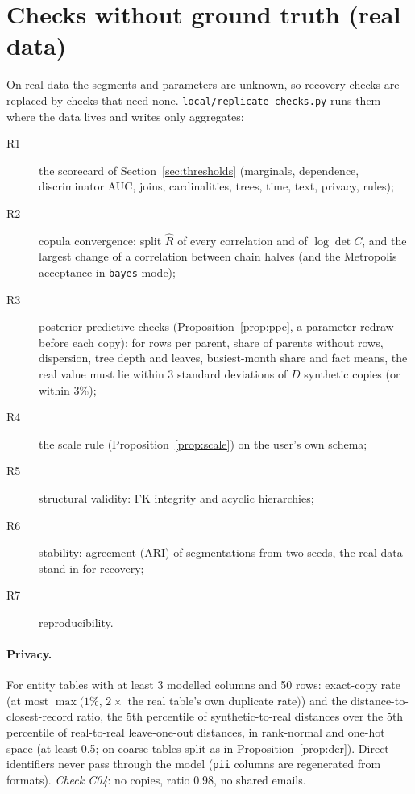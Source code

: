 \documentclass[11pt,a4paper]{article}
\theoremstyle{definition}
\theoremstyle{remark}
\begin{document}
\section{Checks without ground truth (real data)}\label{sec:real}
On real data the segments and parameters are unknown, so recovery checks are replaced by checks that need none. \texttt{local/replicate\_checks.py} runs them where the data lives and writes only aggregates:
\begin{description}
\item[R1] the scorecard of Section~\ref{sec:thresholds} (marginals, dependence, discriminator AUC, joins, cardinalities, trees, time, text, privacy, rules);
\item[R2] copula convergence: split $\hat R$ of every correlation and of $\log\det C$, and the largest change of a correlation between chain halves (and the Metropolis acceptance in \texttt{bayes} mode);
\item[R3] posterior predictive checks (Proposition~\ref{prop:ppc}, a parameter redraw before each copy): for rows per parent, share of parents without rows, dispersion, tree depth and leaves, busiest-month share and fact means, the real value must lie within $3$ standard deviations of $D$ synthetic copies (or within 3\%);
\item[R4] the scale rule (Proposition~\ref{prop:scale}) on the user's own schema;
\item[R5] structural validity: FK integrity and acyclic hierarchies;
\item[R6] stability: agreement (ARI) of segmentations from two seeds, the real-data stand-in for recovery;
\item[R7] reproducibility.
\end{description}
\paragraph{Privacy.} For entity tables with at least 3 modelled columns and 50 rows: exact-copy rate (at most $\max(1\%,\,2\times$ the real table's own duplicate rate$)$) and the distance-to-closest-record ratio, the 5th percentile of synthetic-to-real distances over the 5th percentile of real-to-real leave-one-out distances, in rank-normal and one-hot space (at least 0.5; on coarse tables split as in Proposition~\ref{prop:dcr}). Direct identifiers never pass through the model (\texttt{pii} columns are regenerated from formats). \emph{Check C04}: no copies, ratio 0.98, no shared emails.
\end{document}

